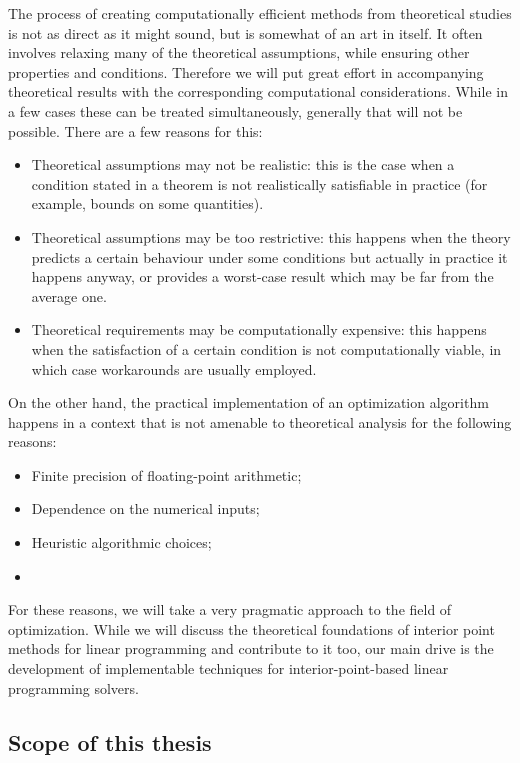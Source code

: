 The process of creating computationally efficient methods from
theoretical studies is not as direct as it might sound, but is somewhat
of an art in itself. It often involves relaxing many of the theoretical 
assumptions, while ensuring other properties and conditions.
Therefore we will put great effort in accompanying theoretical
results with the corresponding computational considerations. While
in a few cases these can be treated simultaneously, generally that
will not be possible. There are a few reasons for this:
\begin{itemize}
\item Theoretical assumptions may not be realistic: this is the case
when a condition stated in a theorem is not realistically satisfiable 
in practice (for example, bounds on some quantities). 
\item Theoretical assumptions may be too restrictive: this happens
when the theory predicts a certain behaviour under some conditions
but actually in practice it happens anyway, or provides a worst-case 
result which may be far from the average one.
\item Theoretical requirements may be computationally expensive: this 
happens when the satisfaction of a certain condition is not 
computationally viable, in which case workarounds are usually employed.
\end{itemize}

On the other hand, the practical implementation of an optimization
algorithm happens in a context that is not amenable to theoretical 
analysis for the following reasons:
\begin{itemize}
\item Finite precision of floating-point arithmetic;
\item Dependence on the numerical inputs;
\item Heuristic algorithmic choices;
\item 
\end{itemize}

For these reasons, we will take a very pragmatic approach to the
field of optimization. While we will discuss the theoretical foundations
of interior point methods for linear programming and contribute to
it too, our main drive is the development of implementable techniques
for interior-point-based linear programming solvers.


%
%
\subsection{Scope of this thesis}

